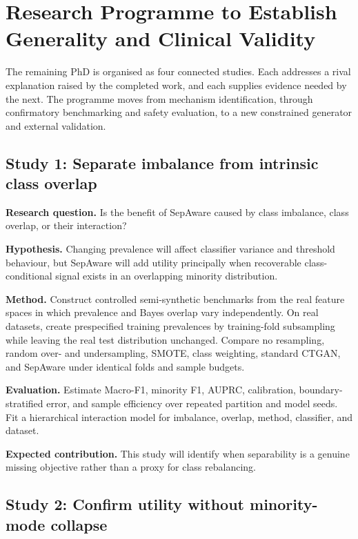 \chapter{Research Programme to Establish Generality and Clinical Validity}
\label{chap:future}

The remaining PhD is organised as four connected studies. Each addresses a rival explanation raised by the completed work, and each supplies evidence needed by the next. The programme moves from mechanism identification, through confirmatory benchmarking and safety evaluation, to a new constrained generator and external validation.

\section{Study 1: Separate imbalance from intrinsic class overlap}

\textbf{Research question.} Is the benefit of SepAware caused by class imbalance, class overlap, or their interaction?

\textbf{Hypothesis.} Changing prevalence will affect classifier variance and threshold behaviour, but SepAware will add utility principally when recoverable class-conditional signal exists in an overlapping minority distribution.

\textbf{Method.} Construct controlled semi-synthetic benchmarks from the real feature spaces in which prevalence and Bayes overlap vary independently. On real datasets, create prespecified training prevalences by training-fold subsampling while leaving the real test distribution unchanged. Compare no resampling, random over- and undersampling, SMOTE, class weighting, standard CTGAN, and SepAware under identical folds and sample budgets.

\textbf{Evaluation.} Estimate Macro-F1, minority F1, AUPRC, calibration, boundary-stratified error, and sample efficiency over repeated partition and model seeds. Fit a hierarchical interaction model for imbalance, overlap, method, classifier, and dataset.

\textbf{Expected contribution.} This study will identify when separability is a genuine missing objective rather than a proxy for class rebalancing.

\section{Study 2: Confirm utility without minority-mode collapse}


